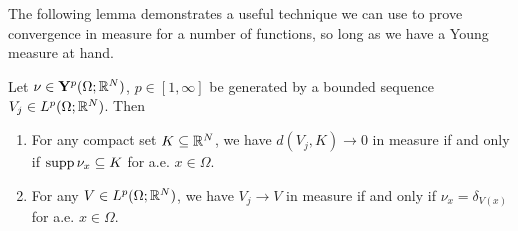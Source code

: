 The following lemma demonstrates a useful technique we can use to prove convergence in measure for a number of functions, so long as we have a Young measure at hand.
\begin{lemma} \label{lem:ymConvergeInMeas}
    Let $\nu \in \mathbf{Y}^p(\Omega;\mathbb{R}^N)$, $p \in [1,\infty]$ be generated by a bounded sequence $V_j \in L^p(\Omega;\mathbb{R}^N)$. Then 
    \begin{enumerate}[label={\rm (\roman*)}]
        \item For any compact set $K \subseteq \mathbb{R}^N$, we have $d(V_j,K) \to 0$ in measure if and only if $\operatorname{supp}{\nu_x} \subseteq K$ for a.e. $x \in \Omega$.
        \item For any $V \in L^p(\Omega;\mathbb{R}^N)$, we have $V_j \to V$ in measure if and only if $\nu_x = \delta_{V(x)}$ for a.e. $x \in \Omega$.
    \end{enumerate}
\end{lemma}
